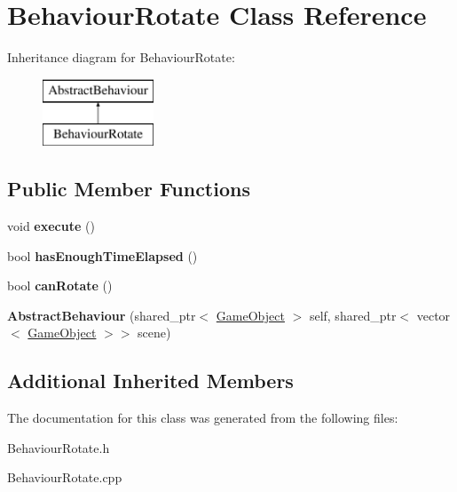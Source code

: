 \hypertarget{class_behaviour_rotate}{}\section{Behaviour\+Rotate Class Reference}
\label{class_behaviour_rotate}
Inheritance diagram for Behaviour\+Rotate\+:\begin{figure}[H]
\begin{center}
\leavevmode
\includegraphics[height=2.000000cm]{class_behaviour_rotate}
\end{center}
\end{figure}
\subsection*{Public Member Functions}
\begin{DoxyCompactItemize}
\item 
\mbox{\label{class_behaviour_rotate_aa01153f4a487813580ecb5d5145da47c}} 
void {\bfseries execute} ()
\item 
\mbox{\label{class_behaviour_rotate_a35e30578ca4a2a7fd96e01573e5791fd}} 
bool {\bfseries has\+Enough\+Time\+Elapsed} ()
\item 
\mbox{\label{class_behaviour_rotate_a93f1ef9eb3fe2ea8dfb49a4e435b48a5}} 
bool {\bfseries can\+Rotate} ()
\item 
\mbox{\label{class_behaviour_rotate_a8a3a9217b3179f949a1d6a32f340c00c}} 
{\bfseries Abstract\+Behaviour} (shared\+\_\+ptr$<$ \mbox{\hyperlink{class_game_object}{Game\+Object}} $>$ self, shared\+\_\+ptr$<$ vector$<$ \mbox{\hyperlink{class_game_object}{Game\+Object}} $>$$>$ scene)
\end{DoxyCompactItemize}
\subsection*{Additional Inherited Members}


The documentation for this class was generated from the following files\+:\begin{DoxyCompactItemize}
\item 
Behaviour\+Rotate.\+h\item 
Behaviour\+Rotate.\+cpp\end{DoxyCompactItemize}
